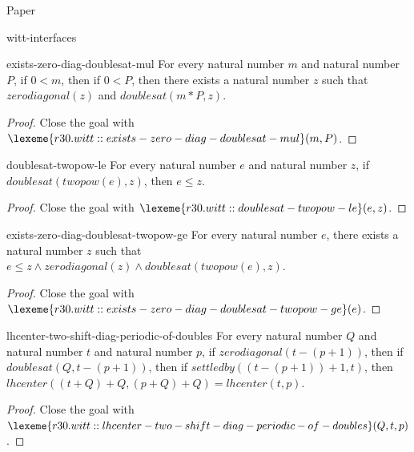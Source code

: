 \begin{lexlean}{Paper}
\begin{section}{witt-interfaces}
  \begin{theorem}{exists-zero-diag-doublesat-mul}
  For every natural number \(m\) and natural number \(P\), if \(0 < m\), then if \(0 < P\), then there exists a natural number \(z\) such that \(zerodiagonal(z)\) and \(doublesat(m * P, z)\).
  \begin{proof}
  Close the goal with \(\lexeme{r30.witt::exists-zero-diag-doublesat-mul}(m, P)\).
  \end{proof}
  \end{theorem}

  \begin{theorem}{doublesat-twopow-le}
  For every natural number \(e\) and natural number \(z\), if \(doublesat(twopow(e), z)\), then \(e ≤ z\).
  \begin{proof}
  Close the goal with \(\lexeme{r30.witt::doublesat-twopow-le}(e, z)\).
  \end{proof}
  \end{theorem}

  \begin{theorem}{exists-zero-diag-doublesat-twopow-ge}
  For every natural number \(e\), there exists a natural number \(z\) such that \(e ≤ z ∧ zerodiagonal(z) ∧ doublesat(twopow(e), z)\).
  \begin{proof}
  Close the goal with \(\lexeme{r30.witt::exists-zero-diag-doublesat-twopow-ge}(e)\).
  \end{proof}
  \end{theorem}

  \begin{theorem}{lhcenter-two-shift-diag-periodic-of-doubles}
  For every natural number \(Q\) and natural number \(t\) and natural number \(p\), if \(zerodiagonal(t - (p + 1))\), then if \(doublesat(Q, t - (p + 1))\), then if \(settledby((t - (p + 1)) + 1, t)\), then \(lhcenter((t + Q) + Q, (p + Q) + Q) = lhcenter(t, p)\).
  \begin{proof}
  Close the goal with \(\lexeme{r30.witt::lhcenter-two-shift-diag-periodic-of-doubles}(Q, t, p)\).
  \end{proof}
  \end{theorem}


\end{section}
\end{lexlean}
